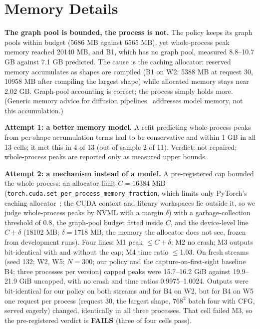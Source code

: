\documentclass[conference]{IEEEtran}
\newcommand{\tn}[1]{#1}%
\begin{document}
\section{Memory Details}\label{sec:mem}
\textbf{The graph pool is bounded, the process is not.} The policy keeps its graph pools within budget (\tn{5686} MB against \tn{6565} MB), yet whole-process peak memory reached \tn{20140} MB, and B1, which has no graph pool, measured \tn{8.8--10.7 GB} against \tn{7.1 GB} predicted. The cause is the caching allocator: reserved memory accumulates as shapes are compiled (B1 on W2: \tn{5388} MB at request 30, \tn{10958} MB after compiling the largest shape) while allocated memory stays near \tn{2.02 GB}. Graph-pool accounting is correct; the process simply holds more. (Generic memory advice for diffusion pipelines~\cite{hf_memory} addresses model memory, not this accumulation.)

\textbf{Attempt 1: a better memory model.} A refit predicting whole-process peaks from per-shape accumulation terms had to be conservative and within 1 GB in all 13 cells; it met this in \tn{4} of 13 (out of sample \tn{2} of 11). Verdict: not repaired; whole-process peaks are reported only as measured upper bounds.

\textbf{Attempt 2: a mechanism instead of a model.} A pre-registered cap bounded the whole process: an allocator limit $C{=}16384$ MiB (\texttt{torch.cuda.set\_per\_process\_memory\_fraction}, which limits only PyTorch's caching allocator~\cite{pt_memfrac}; the CUDA context and library workspaces lie outside it, so we judge whole-process peaks by NVML with a margin $\delta$) with a garbage-collection threshold of 0.8, the graph-pool budget fitted inside $C$, and the device-level line $C{+}\delta$ (\tn{18102} MB; $\delta{=}$\tn{1718} MB, the memory the allocator does not see, frozen from development runs). Four lines: M1 peak $\le C{+}\delta$; M2 no crash; M3 outputs bit-identical with and without the cap; M4 time ratio $\le$1.03. On fresh streams (seed 132; W2, W5; $N{=}300$; our policy and the capture-on-first-sight baseline B4; three processes per version) capped peaks were \tn{15.7--16.2 GiB} against \tn{19.9--21.9 GiB} uncapped, with no crash and time ratios \tn{0.9975--1.0024}. Outputs were bit-identical for our policy on both streams and for B4 on W2, but for B4 on W5 one request per process (request 30, the largest shape, $768^2$ batch four with CFG, served eagerly) changed, identically in all three processes. That cell failed M3, so the pre-registered verdict is \textbf{FAILS} (three of four cells pass).
\end{document}
